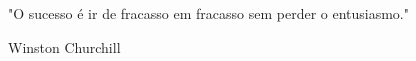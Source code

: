 \begin{epigrafe}
\vspace*{\fill}
		\vfill
		\hspace*{-2cm}
		\hspace*{8cm}	
		\begin{minipage}{8cm}
			"O sucesso é ir de fracasso em fracasso sem perder o entusiasmo."
		\end{minipage}
		\raggedleft Winston Churchill
		 \par		
		\pagebreak
\end{epigrafe}